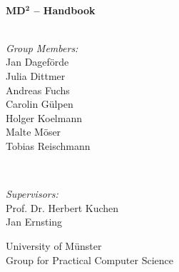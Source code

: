 \documentclass[a4paper, 12pt, titlepage, headsepline, listof = totoc, bibliography = totoc, numbers = noenddot]{scrbook} %
\begin{document}
\begin{titlepage}

\HRule \\[0.8cm]
{ \huge \bfseries MD$\mathbf{^2}$ -- Handbook}\\[0.4cm] %
\HRule \\[1.5cm]
 

\begin{minipage}[t]{0.4\textwidth}
\begin{flushleft} \large
\emph{Group Members:}\\
Jan Dageförde\\
Julia Dittmer\\
Andreas Fuchs\\
Carolin Gülpen\\
Holger Koelmann\\
Malte Möser\\
Tobias Reischmann
\end{flushleft}
\end{minipage}
~
\begin{minipage}[t]{0.5\textwidth}
\begin{flushright}\large

\emph{Supervisors:}\\
Prof. Dr. Herbert Kuchen\\
Jan Ernsting\\\bigskip

University of Münster\\
Group for Practical Computer Science \\
\end{flushright}
\end{minipage}\\[4cm]




\end{titlepage}
\end{document}
